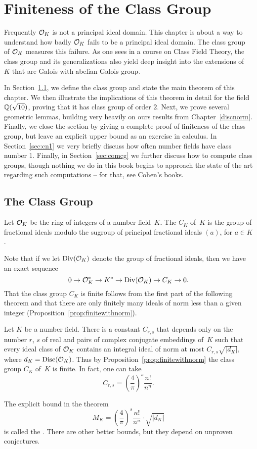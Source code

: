 \chapter{Finiteness of the Class Group}\label{ch:classgroup}
Frequently $\mathcal{O}_K$ is not a principal ideal domain.  This chapter is
about a way to understand how badly $\mathcal{O}_K$ fails to be a principal
ideal domain.  The class group of $\mathcal{O}_K$ measures this failure.  As
one sees in a course on Class Field Theory, the class group and its
generalizations also yield deep insight into the
extensions of~$K$ that are Galois with abelian Galois group.

In Section~\ref{sec:theclassgroup}, we define the class group and
state the main theorem of this chapter.  We then illustrate the
implications of this theorem in detail for the field $\mathbb{Q}(\sqrt{10})$,
proving that it has class group of order $2$. Next, we prove several
geometric lemmas, building very heavily on ours results from
Chapter~\ref{discnorm}.  Finally, we close the section by giving a
complete proof of finiteness of the class group, but leave an explicit
upper bound as an exercise in calculus.  In Section~\ref{sec:cn1} we
very briefly discuss how often number fields have class number 1.
Finally, in Section~\ref{sec:comcg} we further discuss how to compute
class groups, though nothing we do in this book begins to approach the
state of the art regarding such computations -- for that, see Cohen's
books.

\section{The Class Group}\label{sec:theclassgroup}
\begin{definition}
Let $\mathcal{O}_K$ be the ring of integers of a number field~$K$.  The
 $C_K$ of~$K$ is the group of fractional ideals
modulo the sugroup of principal fractional ideals $(a)$, for $a\in K$.
\end{definition}

Note that if we let $\operatorname{Div}(\mathcal{O}_K)$ denote the group of  fractional
ideals, then we have an exact sequence
$$
  0 \to \mathcal{O}_K^* \to K^* \to \operatorname{Div}(\mathcal{O}_K) \to C_K \to 0.
$$
That the class group $C_K$ is finite follows from the first part of
the following theorem and that there are only finitely many
ideals of norm less than a given integer (Proposition~\ref{prop:finitewithnorm}).
\begin{theorem}\label{thm:finiteclassgrp}
Let $K$ be a number field.  There is a constant $C_{r,s}$ that
depends only on the number $r$, $s$ of real and pairs
of complex conjugate embeddings of~$K$ such that
every ideal class of $\mathcal{O}_K$ contains an integral ideal
of norm at most $C_{r,s}\sqrt{|d_K|}$, where
$d_K=\operatorname{Disc}(\mathcal{O}_K)$.
Thus by Proposition~\ref{prop:finitewithnorm}
the class group $C_K$ of~$K$ is
finite.
In fact, one can take
$$C_{r,s} = \left(\frac{4}{\pi}\right)^s\frac{n!}{n^n}.$$
\end{theorem}
The explicit bound in the theorem
$$M_K = \left(\frac{4}{\pi}\right)^s\frac{n!}{n^n} \cdot \sqrt{|d_K|}$$
is called the .  There are other better bounds, but they depend on unproven
conjectures.

